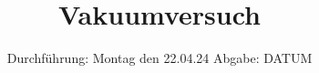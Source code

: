 

\subject{V70}
\title{Vakuumversuch}
\date{%
  Durchführung: Montag den 22.04.24
  \hspace{3em}
  Abgabe: DATUM
}



\maketitle
\thispagestyle{empty}
\tableofcontents
\newpage






\printbibliography{}
%

